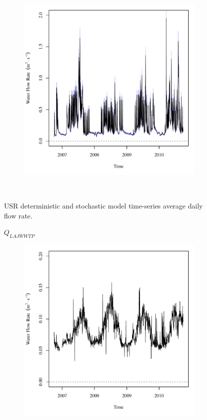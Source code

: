 \begin{linenumbers}
\begin{landscape}
\begin{figure}
\begin{subfigure}{0.7\textwidth}
			\includegraphics[width=\tableCustomSize]{"Figures/Results_USR/Stochastic/Q HRC"}
		\end{subfigure}\\
		\caption{USR deterministic and stochastic model time-series average daily flow rate.}
	\end{figure}
\end{landscape}
\subfiguremid
\begin{landscape}
	\begin{figure}
		\centering
		$ Q_{LAJWWTP} $
		\begin{subfigure}{0.7\textwidth}
			\centering
			\includegraphics[width=\tableCustomSize]{"Figures/Results_USR/Deterministic/Q WTP"}

\end{subfigure}
\end{figure}
\end{landscape}
\end{linenumbers}
